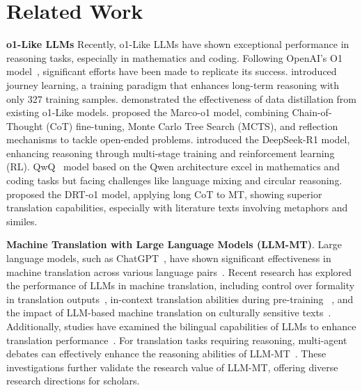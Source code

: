 \section{Related Work}
\textbf{o1-Like LLMs} Recently, o1-Like LLMs have shown exceptional performance in reasoning tasks, especially in mathematics and coding. Following OpenAI's O1 model~\cite{openai2024reasoning}, significant efforts have been made to replicate its success. \citealp{DBLP:journals/corr/abs-2410-18982} introduced journey learning, a training paradigm that enhances long-term reasoning with only 327 training samples. \citealp{DBLP:journals/corr/abs-2411-16489} demonstrated the effectiveness of data distillation from existing o1-Like models. \citealp{DBLP:journals/corr/abs-2411-14405} proposed the Marco-o1 model, combining Chain-of-Thought (CoT) fine-tuning, Monte Carlo Tree Search (MCTS), and reflection mechanisms to tackle open-ended problems. \citealp{guo2025deepseek} introduced the DeepSeek-R1 model, enhancing reasoning through multi-stage training and reinforcement learning (RL). QwQ~\cite{qwen2024qwq} model based on the Qwen architecture excel in mathematics and coding tasks but facing challenges like language mixing and circular reasoning. \citealp{DBLP:journals/corr/abs-2412-17498} proposed the DRT-o1 model, applying long CoT to MT, showing superior translation capabilities, especially with literature texts involving metaphors and similes.

\textbf{Machine Translation with Large Language Models (LLM-MT)}. Large language models, such as ChatGPT~\cite{ouyang2022training}, have shown significant effectiveness in machine translation across various language pairs~\cite{hendy2023good,jiao2023chatgpt,le2023bloom,DBLP:conf/wmt/IyerCB23,DBLP:journals/corr/abs-2311-02851,DBLP:conf/wmt/KarpinskaI23,DBLP:conf/wmt/MoslemRMKHW23,DBLP:conf/emnlp/WangLJZY0T23,DBLP:conf/wmt/IyerCB23,DBLP:conf/emnlp/FarinhasSM23}. Recent research has explored the performance of LLMs in machine translation, including control over formality in translation outputs~\cite{garcia2022using}, in-context translation abilities during pre-training ~\cite{shin2022effect}, and the impact of LLM-based machine translation on culturally sensitive texts~\cite{DBLP:journals/corr/abs-2305-14328}. Additionally, studies have examined the bilingual capabilities of LLMs to enhance translation performance~\cite{huang2024aligning}. For translation tasks requiring reasoning, multi-agent debates can effectively enhance the reasoning abilities of LLM-MT~\cite{liang2023encouraging}. These investigations further validate the research value of LLM-MT, offering diverse research directions for scholars.






